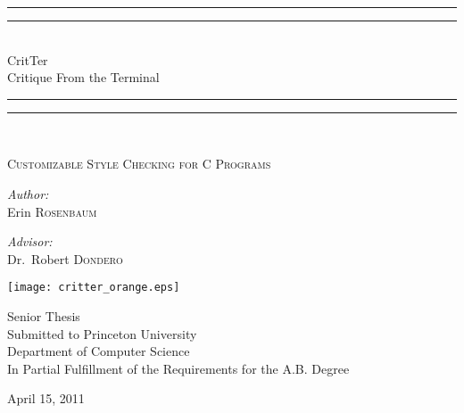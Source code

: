 \begin{titlepage}

\begin{center}

\rule{\linewidth}{1.6pt}\vspace*{-\baselineskip}\vspace*{2pt}
\rule{\linewidth}{0.4pt}\\[\baselineskip]
{\huge CritTer \\[0.5\baselineskip] Critique From the Terminal}\\[0.2\baselineskip]
\rule{\linewidth}{0.4pt}\vspace*{-\baselineskip}\vspace{3.2pt}
\rule{\linewidth}{1.6pt}\\[\baselineskip]
{\scshape
\Large Customizable Style Checking for C Programs \par}
\vspace*{4\baselineskip}

\begin{minipage}{0.4\textwidth}
\begin{flushleft} \large
\emph{Author:}\\
Erin \textsc{Rosenbaum}
\end{flushleft}
\end{minipage}
\begin{minipage}{0.4\textwidth}
\begin{flushright} \large
\emph{Advisor:} \\
Dr.~Robert \textsc{Dondero}
\end{flushright}
\end{minipage}

\vspace{1.5cm}
\texttt{[image: critter\_orange.eps]}

\vspace{1.5cm}
\small{
Senior Thesis \\[0.4cm]
Submitted to Princeton University \\
Department of Computer Science\\
In Partial Fulfillment of the Requirements for the A.B. Degree \\
}

\vfill

{\normalsize April 15, 2011}

\end{center}

\end{titlepage}
